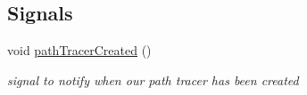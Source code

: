 \subsection*{Signals}
\begin{DoxyCompactItemize}
\item 
\hypertarget{class_open_g_l_widget_aeb2a8fd11aa8cea07af18de1fa781d95}{void \hyperlink{class_open_g_l_widget_aeb2a8fd11aa8cea07af18de1fa781d95}{path\-Tracer\-Created} ()}\label{class_open_g_l_widget_aeb2a8fd11aa8cea07af18de1fa781d95}

\begin{DoxyCompactList}\small\item\em signal to notify when our path tracer has been created \end{DoxyCompactList}\end{DoxyCompactItemize}

